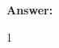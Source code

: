 \documentclass[12pt,twoside]{article}
\newcommand{\answer}{
 \par\medskip
 \textbf{Answer:}
}
\newcommand{\answerIId}{ \answer
1
}
\begin{document}
\begin{problems}
\begin{problemparts}
\answerIId

%
%
%
%
%
%
%
%
%
%
%
%
%
%
%


\end{problemparts}

\end{problems}
\end{document}
